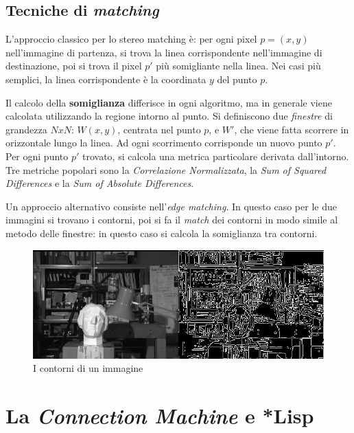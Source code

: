\documentclass[12pt,a4paper,openright,twoside]{report}
\begin{document}
\section{Tecniche di \textit{matching}}

L'approccio classico per lo stereo matching è: per ogni pixel $p = (x, y)$ nell'immagine di partenza, si trova la linea corrispondente nell'immagine di destinazione, poi si trova il pixel $p'$ più somigliante nella linea. Nei casi più semplici, la linea corrispondente è la coordinata $y$ del punto $p$.

Il calcolo della \textbf{somiglianza} differisce in ogni algoritmo, ma in generale viene calcolata utilizzando la regione intorno al punto. Si definiscono due \textit{finestre} di grandezza $NxN$: $W (x, y)$, centrata nel punto $p$, e $W'$, che viene fatta scorrere in orizzontale lungo la linea. Ad ogni scorrimento corrisponde un nuovo punto $p'$. Per ogni punto $p'$ trovato, si calcola una metrica particolare derivata dall'intorno. Tre metriche popolari sono la \textit{Correlazione Normalizzata}, la \textit{Sum of Squared Differences} e la \textit{Sum of Absolute Differences}.

Un approccio alternativo consiste nell'\textit{edge matching}. In questo caso per le due immagini si trovano i contorni, poi si fa il \textit{match} dei contorni in modo simile al metodo delle finestre: in questo caso si calcola la somiglianza tra contorni.

\begin{figure}[h]
    \centering
    \includegraphics[width=\textwidth]{contours.png}
    \caption{I contorni di un immagine}
    \label{img:contours}
\end{figure}




\chapter{La \textit{Connection Machine} e *Lisp}
\end{document}
